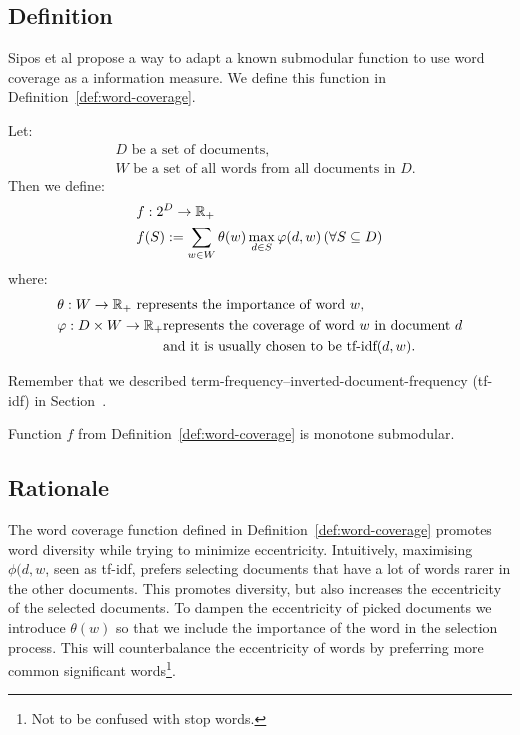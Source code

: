 \subsection{Definition}

Sipos et al \cite{sipos2012temporal} propose a way to adapt a known submodular
function to use word coverage as a information measure. We define this function
in Definition~\ref{def:word-coverage}.
\begin{definition}
  \label{def:word-coverage}
  Let:
  \begin{align*}
    &D \text{ be a set of documents, } \\
    &W \text{ be a set of all words from all documents in \(D\).}
  \end{align*}
  Then we define:
  \begin{align*}
    &f : 2^D \to \mathbb{R}_+ \\
    &f(S) := \sum_{w \in W} \theta(w) \max_{d \in S} \varphi(d, w)
    \,(\forall S \subseteq D)
  \end{align*}
  where:
  \begin{align*}
    &\theta : W \to \mathbb{R}_+ \text{ represents the importance of word \(w\),} \\
    &\varphi : D \times W \to \mathbb{R}_+
    \begin{aligned}[t]
      &\text{represents the coverage of word \(w\) in document \(d\)} \\
      &\text{and it is usually chosen to be tf-idf\((d, w)\).}
    \end{aligned}
  \end{align*}
\end{definition}
Remember that we described term-frequency--inverted-document-frequency
(tf-idf) in Section~.

\begin{proposition}
  Function \(f\) from Definition~\ref{def:word-coverage} is monotone submodular.
\end{proposition}

\subsection{Rationale}

The word coverage function defined in Definition~\vref{def:word-coverage}
promotes word diversity while trying to minimize eccentricity. Intuitively,
maximising \(\phi(d, w\), seen as tf-idf, prefers selecting documents that have
a lot of words rarer in the other documents. This promotes diversity, but also
increases the eccentricity of the selected documents. To dampen the
eccentricity of picked documents we introduce \(\theta(w)\) so that we include
the importance of the word in the selection process. This will counterbalance
the eccentricity of words by preferring more common significant
words\footnote{Not to be confused with stop words.}.

